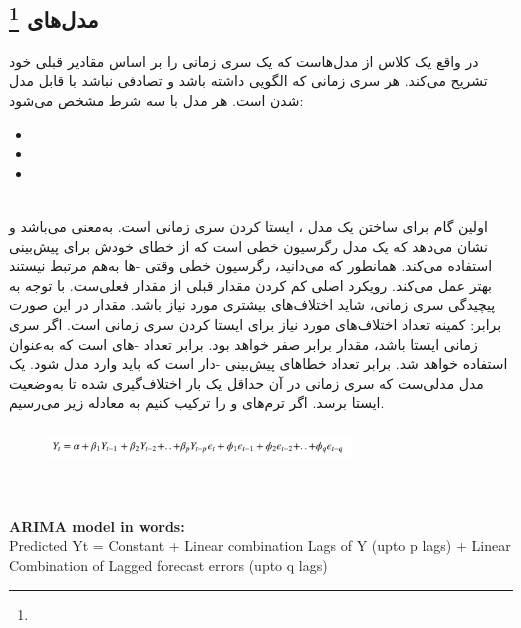 \documentclass{article}
\begin{document}
\ \\
\subsection*{مدل‌های \footnote{}}
 در واقع یک کلاس از مدل‌هاست که یک سری زمانی را بر اساس مقادیر قبلی خود تشریح می‌کند. هر سری زمانی که الگویی داشته باشد و  تصادفی نباشد با  قابل مدل شدن است. هر مدل  با سه شرط مشخص می‌شود: 
\begin{latin}
\begin{flushleft}
\begin{itemize}
	\item {} 
	\item {}
	\item {}
\end{itemize}
\end{flushleft}
\end{latin}
\ \\
اولین گام برای ساختن یک مدل ، ایستا کردن سری زمانی است.  به‌معنی  می‌باشد و نشان می‌دهد که یک مدل رگرسیون خطی است که از خطای خودش برای پیش‌بینی استفاده می‌کند. همانطور که می‌دانید، رگرسیون خطی وقتی -ها به‌هم مرتبط نیستند بهتر عمل می‌کند. رویکرد اصلی کم کردن مقدار قبلی از مقدار فعلی‌‌ست. با توجه به پیچیدگی سری زمانی، شاید اختلاف‌های بیشتری مورد نیاز باشد. مقدار  در این صورت برابر‌: کمینه تعداد اختلاف‌های مورد نیاز برای ایستا کردن سری زمانی است. اگر سری زمانی ایستا باشد، مقدار  برابر صفر خواهد بود.  برابر تعداد -های  است که به‌عنوان  استفاده خواهد شد.  برابر تعداد خطاهای پیش‌بینی -دار است که باید وارد مدل  شود. یک مدل  مدلی‌ست که سری زمانی در آن حداقل یک بار اختلاف‌گیری شده تا به‌وضعیت ایستا برسد. اگر ترم‌های  و  را ترکیب کنیم به معادله زیر می‌رسیم.
\begin{figure}[hbt!]
	\centering
	\includegraphics[width=8cm,height=1cm]{Outputs/e5.png}
\end{figure}
\ \\
\begin{latin}
\begin{flushleft}
\textbf{ARIMA model in words:}\\
Predicted Yt = Constant + Linear combination Lags of Y (upto p lags) + Linear Combination of Lagged forecast errors (upto q lags)
\end{flushleft}
\end{latin}
\end{document}
